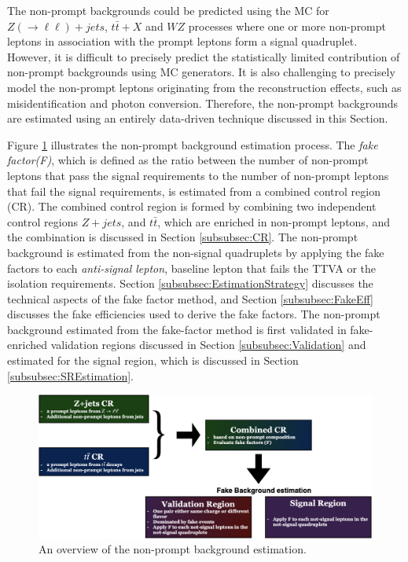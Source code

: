 The non-prompt backgrounds could be predicted using the MC for $Z(\rightarrow \ell \ell) + jets $, $t\bar{t}+X$ and $WZ$ processes where one or more non-prompt leptons in association with the prompt leptons form a signal quadruplet. However, it is difficult to precisely predict the statistically limited contribution of non-prompt backgrounds using MC generators. It is also challenging to precisely model the non-prompt leptons originating from the reconstruction effects, such as misidentification and photon conversion. Therefore, the non-prompt backgrounds are estimated using an entirely data-driven technique discussed in this Section.

Figure \ref{fig:FakeBkgOverview} illustrates the non-prompt background estimation process. The \textit{fake factor(F)}, which is defined as the ratio between the number of non-prompt leptons that pass the signal requirements to the number of non-prompt leptons that fail the signal requirements, is estimated from a combined control region (CR). The combined control region is formed by combining two independent control regions $Z+jets$, and $t\bar{t}$, which are enriched in non-prompt leptons, and the combination is discussed in Section \ref{subsubsec:CR}. The non-prompt background is estimated from the non-signal quadruplets by applying the fake factors to each \textit{anti-signal lepton}, baseline lepton that fails the TTVA or the isolation requirements. Section \ref{subsubsec:EstimationStrategy} discusses the technical aspects of the fake factor method, and Section \ref{subsubsec:FakeEff} discusses the fake efficiencies used to derive the fake factors. The non-prompt background estimated from the fake-factor method is first validated in fake-enriched validation regions discussed in Section \ref{subsubsec:Validation} and estimated for the signal region, which is discussed in Section \ref{subsubsec:SREstimation}. 

\begin{figure}[!htbp]
    \centering
    \includegraphics[width=.99\linewidth, angle =0]{figures/Analysis/Background/FakeBackgroundOverview.png}  
    \caption{An overview of the non-prompt background estimation.\label{fig:FakeBkgOverview}}
\end{figure}

